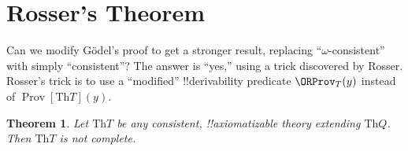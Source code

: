 \documentclass[10pt,a4paper]{article}
\theoremstyle{plain}
\newtheorem{thm}{Theorem}[section]
\theoremstyle{definition}
\theoremstyle{remark}
\newcommand*{\olfileid}[3]{}
\newcommand*{\olsection}[1]{\section*{#1}}
\newcommand*{\ollabel}[1]{\label{#1}}
\providecommand{\Th}{\ensuremath{\mathrm{Th}}}
\providecommand{\OProv}{\operatorname{Prov}}
\begin{document}



\olfileid{inc}{inp}{ros}

\olsection{Rosser's Theorem}

Can we modify G\"odel's proof to get a stronger result, replacing
``$\omega$-consistent'' with simply ``consistent''? The answer is
``yes,'' using a trick discovered by Rosser.  Rosser's trick is to use
a ``modified'' !!{derivability} predicate $\ORProv_T(y)$ instead of
$\OProv[\Th{T}](y)$.

\begin{thm}
\ollabel{thm:rosser}
Let $\Th{T}$ be any consistent, !!{axiomatizable} theory
extending $\Th{Q}$. Then $\Th{T}$ is not complete.
\end{thm}
\end{document}
